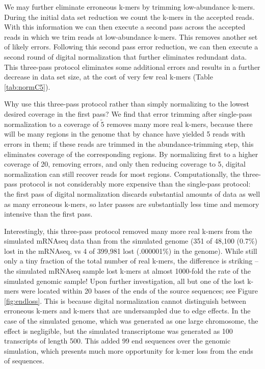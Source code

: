 \documentclass[10pt]{article}
\begin{document}
We may further eliminate erroneous k-mers by trimming low-abundance
k-mers.  During the initial data set reduction we count the k-mers in
the accepted reads.  With this information we can then execute a
second pass across the accepted reads in which we trim reads at
low-abundance k-mers.  This removes another set of likely errors.
Following this second pass error reduction, we can then execute a
second round of digital normalization that further eliminates
redundant data.  This three-pass protocol eliminates some additional
errors and results in a further decrease in data set size, at the cost
of very few real k-mers (Table \ref{tab:normC5}).

Why use this three-pass protocol rather than simply normalizing to the
lowest desired coverage in the first pass?  We find that error
trimming after single-pass normalization to a coverage of $\tilde 5$
removes many more real k-mers, because there will be many regions in
the genome that by chance have yielded 5 reads with errors in them; if
these reads are trimmed in the abundance-trimming step, this
eliminates coverage of the corresponding regions.  By normalizing
first to a higher coverage of 20, removing errors, and only then
reducing coverage to 5, digital normalization can still recover reads
for most regions.  Computationally, the three-pass protocol is not
considerably more expensive than the single-pass protocol: the first
pass of digital normalization discards substantial amounts of data as
well as many erroneous k-mers, so later passes are substantially less
time and memory intensive than the first pass.

Interestingly, this three-pass protocol removed many more real k-mers
from the simulated mRNAseq data than from the simulated genome (351 of
48,100 (0.7\%) lost in the mRNAseq, vs 4 of 399,981 lost
(.000001\%) in the genome).  While still only a tiny fraction of the
total number of real k-mers, the difference is striking -- the
simulated mRNAseq sample lost k-mers at almost 1000-fold the rate of
the simulated genomic sample!  Upon further investigation, all but one
of the lost k-mers were located within 20 bases of the ends of the
source sequences; see Figure \ref{fig:endloss}.  This is because
digital normalization cannot distinguish between erroneous k-mers and
k-mers that are undersampled due to edge effects.  In the case of the
simulated genome, which was generated as one large chromosome, the
effect is negligible, but the simulated transcriptome was generated as
100 transcripts of length 500.  This added 99 end sequences over the
genomic simulation, which presents much more opportunity for k-mer
loss from the ends of sequences.
\end{document}

